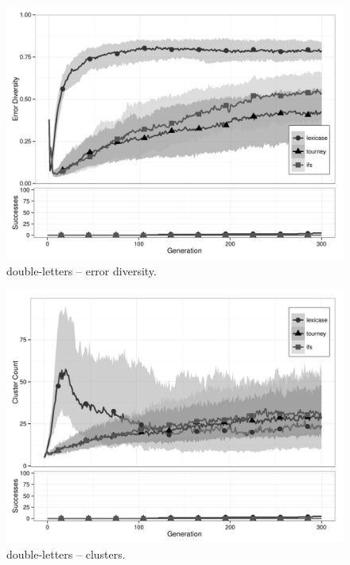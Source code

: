 \begin{figure}%
\centering
\includegraphics[width=11.5cm]{double-letters-diversity.pdf}
\caption{double-letters -- error diversity.}
\label{double-lettersDiv}
\end{figure}

\begin{figure}%
\centering
\includegraphics[width=11.5cm]{double-letters-cluster.pdf}
\caption{double-letters -- clusters.}
\label{double-lettersClu}
\end{figure}

